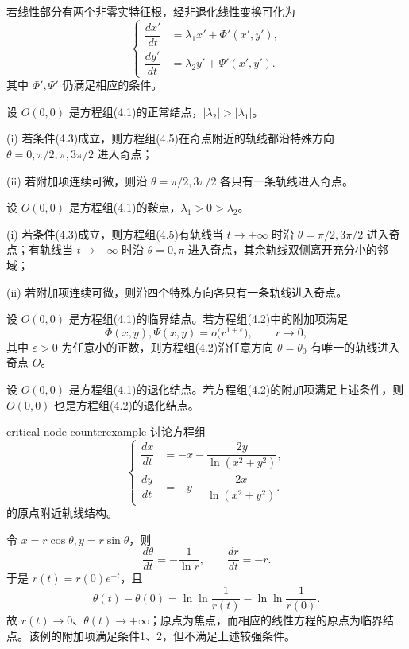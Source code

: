 若线性部分有两个非零实特征根，经非退化线性变换可化为
\[
\left\{\begin{aligned}
\dfrac{dx'}{dt}&=\lambda_1x'+\Phi'(x',y'),\\
\dfrac{dy'}{dt}&=\lambda_2y'+\Psi'(x',y').
\end{aligned}\right.\tag{4.5}
\]
其中 $\Phi',\Psi'$ 仍满足相应的条件。

\begin{theorem}{}{}
设 $O(0,0)$ 是方程组(4.1)的正常结点，$|\lambda_2|>|\lambda_1|$。

\noindent (i) 若条件(4.3)成立，则方程组(4.5)在奇点附近的轨线都沿特殊方向 $\theta=0,\pi/2,\pi,3\pi/2$ 进入奇点；

\noindent (ii) 若附加项连续可微，则沿 $\theta=\pi/2,3\pi/2$ 各只有一条轨线进入奇点。
\end{theorem}

\begin{theorem}{}{}
设 $O(0,0)$ 是方程组(4.1)的鞍点，$\lambda_1>0>\lambda_2$。

\noindent (i) 若条件(4.3)成立，则方程组(4.5)有轨线当 $t\to+\infty$ 时沿 $\theta=\pi/2,3\pi/2$ 进入奇点；有轨线当 $t\to-\infty$ 时沿 $\theta=0,\pi$ 进入奇点，其余轨线双侧离开充分小的邻域；

\noindent (ii) 若附加项连续可微，则沿四个特殊方向各只有一条轨线进入奇点。
\end{theorem}

\begin{theorem}{}{}
设 $O(0,0)$ 是方程组(4.1)的临界结点。若方程组(4.2)中的附加项满足
\[
\Phi(x,y),\Psi(x,y)=o\bigl(r^{1+\varepsilon}\bigr),\qquad r\to0,
\]
其中 $\varepsilon>0$ 为任意小的正数，则方程组(4.2)沿任意方向 $\theta=\theta_0$ 有唯一的轨线进入奇点 $O$。
\end{theorem}

\begin{theorem}{}{}
设 $O(0,0)$ 是方程组(4.1)的退化结点。若方程组(4.2)的附加项满足上述条件，则 $O(0,0)$ 也是方程组(4.2)的退化结点。
\end{theorem}

\begin{example}{}{critical-node-counterexample}
讨论方程组
\[
\left\{\begin{aligned}
\dfrac{dx}{dt}&=-x-\dfrac{2y}{\ln(x^2+y^2)},\\
\dfrac{dy}{dt}&=-y-\dfrac{2x}{\ln(x^2+y^2)}.
\end{aligned}\right.\tag{4.6}
\]
的原点附近轨线结构。
\end{example}
令 $x=r\cos\theta,y=r\sin\theta$，则
\[
\dfrac{d\theta}{dt}=-\dfrac1{\ln r},\qquad
\dfrac{dr}{dt}=-r.\tag{4.7}
\]
于是 $r(t)=r(0)e^{-t}$，且
\[
\theta(t)-\theta(0)=\ln\ln\dfrac1{r(t)}-\ln\ln\dfrac1{r(0)}.
\]
故 $r(t)\to0$、$\theta(t)\to+\infty$；原点为焦点，而相应的线性方程的原点为临界结点。该例的附加项满足条件1、2，但不满足上述较强条件。


